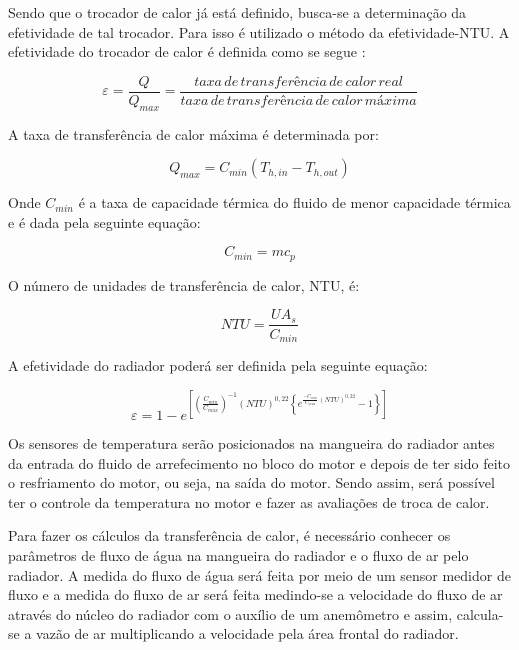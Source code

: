 Sendo que o trocador de calor já está definido, busca-se a determinação da efetividade de tal trocador. Para isso é utilizado o método da efetividade-NTU. A efetividade do trocador de calor é definida como se segue \cite{energiaTransferencia}:

\begin{equation}
	\varepsilon = \frac{Q}{Q_{max}} = \frac{taxa\,de\,transferência\,de\,calor\,real}{taxa\,de\,transferência\,de\,calor\,máxima}
\end{equation}

A taxa de transferência de calor máxima é determinada por:

\begin{equation}
	Q_{max} = C_{min} (T_{h, in} - T_{h, out})
\end{equation}

Onde $C_{min}$ é a taxa de capacidade térmica do fluido de menor capacidade térmica e é dada pela seguinte equação:

\begin{equation}
	C_{min} = mc_{p}
\end{equation}

O número de unidades de transferência de calor, NTU, é:

\begin{equation}
	NTU = \frac{UA_{s}}{C_{min}}
\end{equation}

A efetividade do radiador poderá ser definida pela seguinte equação:

\begin{equation}
	\varepsilon = 1 - e^{\left [ \left ( \frac{C_{min}}{C_{max}} \right ) ^{-1} \left ( NTU \right ) ^{0,22} \left \{ e^{\frac{-C_{min}}{C_{max}} \left ( NTU \right ) ^{0,22}} -1 \right \} \right ]}
\end{equation}

Os sensores de temperatura serão posicionados na mangueira do radiador antes da entrada do fluido de arrefecimento no bloco do motor e depois de ter sido feito o resfriamento do motor, ou seja, na saída do motor. Sendo assim, será possível ter o controle da temperatura no motor e fazer as avaliações de troca de calor.

Para fazer os cálculos da transferência de calor, é necessário conhecer os parâmetros de fluxo de água na mangueira do radiador e o fluxo de ar pelo radiador. A medida do fluxo de água será feita por meio de um sensor medidor de fluxo e a medida do fluxo de ar será feita medindo-se a velocidade do fluxo de ar através do núcleo do radiador com o auxílio de um anemômetro e assim, calcula-se a vazão de ar multiplicando a velocidade pela área frontal do radiador.


